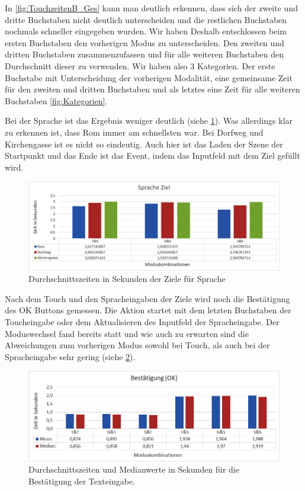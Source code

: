 In \ref{fig:TouchzeitenB_Ges} kann man deutlich erkennen, dass sich der zweite und dritte Buchstaben nicht deutlich unterscheiden und die restlichen Buchstaben nochmals schneller eingegeben wurden. Wir haben Deshalb entschlossen beim ersten Buchstaben den vorherigen Modus zu unterscheiden. Den zweiten und dritten Buchstaben zusammenzufassen und für alle weiteren Buchstaben den Durchschnitt dieser zu verwenden. Wir haben also 3 Kategorien. Der erste Buchstabe mit Unterscheidung der vorherigen Modalität, eine gemeinsame Zeit für den zweiten und dritten Buchstaben und als letztes eine Zeit für alle weiteren Buchstaben \ref{fig:Kategorien}.

Bei der Sprache ist das Ergebnis weniger deutlich (siehe \ref{fig:SpracheZiel}). Was allerdings klar zu erkennen ist, dass Rom immer am schnellsten war. Bei Dorfweg und Kirchengasse ist es nicht so eindeutig. Auch hier ist das Laden der Szene der Startpunkt und das Ende ist das Event, indem das Inputfeld mit dem Ziel gefüllt wird.
\begin{figure}[ht]
  \centering
  \includegraphics[width=1\textwidth]{img/SpracheZiel.JPG}
  \caption{Durchschnittszeiten in Sekunden der Ziele für Sprache}
  \label{fig:SpracheZiel}
\end{figure} 

Nach dem Touch und den Spracheingaben der Ziele wird noch die Bestätigung des OK Buttons gemessen. Die Aktion startet mit dem letzten Buchstaben der Toucheingabe oder dem Aktualisieren des Inputfeld der Spracheingabe. Der Moduswechsel fand bereits statt und wie auch zu erwarten sind die Abweichungen zum vorherigen Modus sowohl bei Touch, als auch bei der Spracheingabe sehr gering (siehe \ref{fig:Bestaetigung_OK}).
\begin{figure}[ht]
  \centering
  \includegraphics[width=1\textwidth]{img/B_OK.jpg}
  \caption{Durchschnittszeiten und Medianwerte in Sekunden für die Bestätigung der Texteingabe.}
  \label{fig:Bestaetigung_OK}
\end{figure} 

